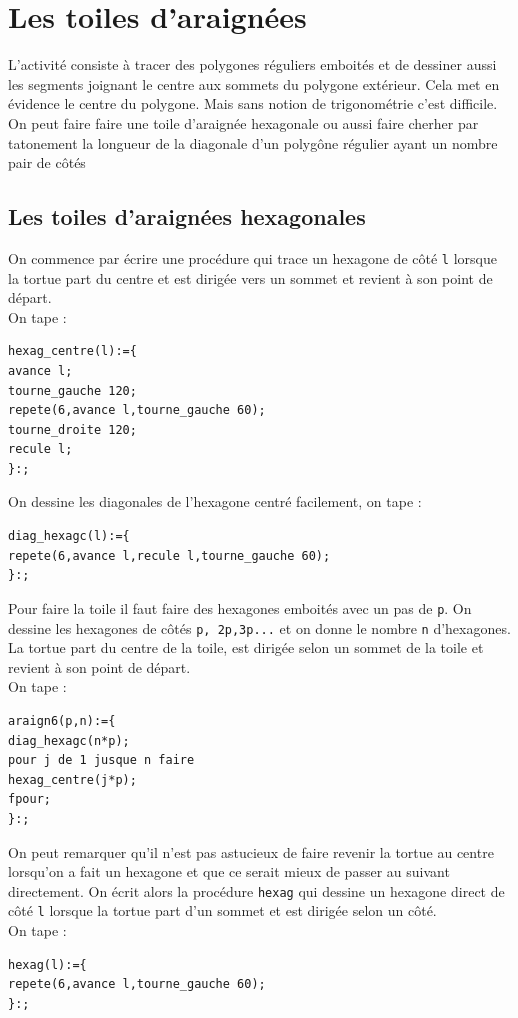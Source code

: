 \documentclass[a4paper,11pt]{book}
\begin{document}
\section{Les toiles d'araign\'ees}
L'activit\'e consiste \`a tracer des polygones r\'eguliers emboit\'es et de 
dessiner aussi les segments joignant le centre aux sommets du polygone 
ext\'erieur. Cela met en \'evidence le centre du polygone. Mais sans notion de 
trigonom\'etrie c'est difficile. On peut faire faire une toile d'araign\'ee 
hexagonale ou aussi faire cherher par tatonement la longueur de la diagonale
d'un polyg\^one r\'egulier ayant un nombre pair de c\^ot\'es

\subsection{Les toiles d'araign\'ees hexagonales}
On commence par \'ecrire une proc\'edure qui trace un hexagone  de c\^ot\'e 
{\tt l} lorsque la tortue part du centre et est dirig\'ee vers un sommet et 
revient  \`a son point de d\'epart.\\
On tape :
\begin{verbatim}
hexag_centre(l):={
avance l;
tourne_gauche 120;
repete(6,avance l,tourne_gauche 60);
tourne_droite 120;
recule l;
}:;
\end{verbatim}
On dessine les diagonales de l'hexagone centr\'e facilement, on tape :
\begin{verbatim}
diag_hexagc(l):={
repete(6,avance l,recule l,tourne_gauche 60);
}:;
\end{verbatim} 
Pour faire la toile il faut faire des hexagones emboit\'es avec un pas de 
{\tt p}. On dessine les hexagones de c\^ot\'es {\tt p, 2p,3p...} et on donne le 
nombre {\tt n} d'hexagones. La tortue part du centre de la toile, est dirig\'ee
selon un sommet de la toile et revient \`a son point de d\'epart.\\
On tape :
\begin{verbatim}
araign6(p,n):={
diag_hexagc(n*p);
pour j de 1 jusque n faire 
hexag_centre(j*p);
fpour;
}:;  
\end{verbatim} 
On peut remarquer qu'il n'est pas astucieux de faire revenir la tortue au 
centre lorsqu'on a fait un hexagone et que ce serait mieux de passer au suivant
directement. On \'ecrit alors la proc\'edure {\tt hexag} qui dessine un 
hexagone direct de c\^ot\'e {\tt l} lorsque la tortue part d'un sommet et est 
dirig\'ee selon un c\^ot\'e.\\
On tape :
\begin{verbatim}
hexag(l):={
repete(6,avance l,tourne_gauche 60);
}:;
\end{verbatim}
\end{document}
